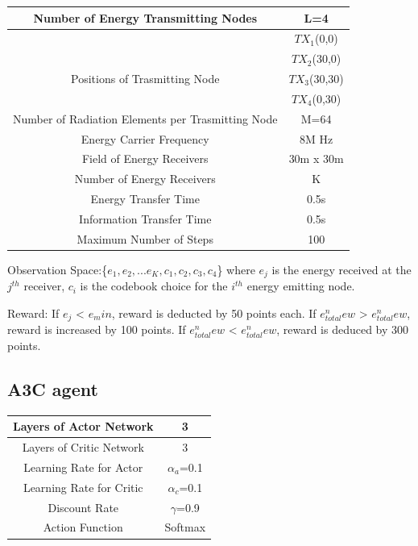 \documentclass[journal]{IEEEtran}
\begin{document}
\begin{small}
\begin{center}
\begin{tabular}{ c c }
\hline
Number of Energy Transmitting Nodes & L=4\\
\hline
&$TX_1$(0,0)\\
&$TX_2$(30,0)\\
{Positions of Trasmitting Node}&$TX_3$(30,30)\\
&$TX_4$(0,30)\\
\hline
Number of Radiation Elements per Trasmitting Node & M=64\\
\hline
Energy Carrier Frequency & 8M Hz\\
\hline
Field of Energy Receivers & 30m x 30m\\
\hline
Number of Energy Receivers & K \\
\hline
Energy Transfer Time & 0.5s \\
\hline
Information Transfer Time & 0.5s\\
\hline
Maximum Number of Steps & 100\\
\hline

\end{tabular}
\end{center}
\end{small}

Observation Space:\{$e_1,e_2,...e_K,c_1,c_2,c_3,c_4$\}
where $e_j$ is the energy received at the $j^{th}$ receiver, $c_i$ is the codebook choice for the $i^{th}$ energy emitting node.

Reward: If $e_j$ < $e_min$, reward is deducted by 50 points each. If $e_{total}^new$ > $e_{total}^new$, reward is increased by 100 points. If $e_{total}^new$ < $e_{total}^new$, reward is deduced by 300 points.

\subsection{A3C agent}
\begin{small}
\begin{center}
\begin{tabular}{ c c }
\hline
Layers of Actor Network & 3\\
\hline
Layers of Critic Network & 3\\
\hline
Learning Rate for Actor & $\alpha_a$=0.1\\
\hline
Learning Rate for Critic & $\alpha_c$=0.1\\
\hline
Discount Rate & $\gamma$=0.9 \\
\hline
Action Function & Softmax \\
\hline

\end{tabular}
\end{center}
\end{small}
\end{document}
